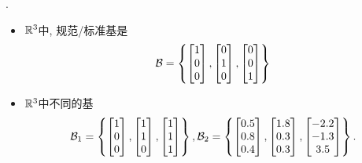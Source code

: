 \begin{example}
    .
    \begin{itemize}
        \item $\mathbb{R}^3$中, 规范/标准基是
        \begin{equation}
            \mathcal{B} = \left\{
                \begin{bmatrix} 1 \\ 0 \\ 0 \end{bmatrix},
                \begin{bmatrix} 0 \\ 1 \\ 0 \end{bmatrix},
                \begin{bmatrix} 0 \\ 0 \\ 1 \end{bmatrix}
            \right\}
        \end{equation}
        \item $\mathbb{R}^3$中不同的基
        \begin{equation}
           \mc{B}_1 = \left\{
                \begin{bmatrix} 1 \\ 0 \\ 0 \end{bmatrix},
                \begin{bmatrix} 1 \\ 1 \\ 0 \end{bmatrix},
                \begin{bmatrix} 1 \\ 1 \\ 1 \end{bmatrix}
            \right\},
            \mc{B}_2 = \left\{
                \begin{bmatrix} 0.5 \\ 0.8 \\ 0.4 \end{bmatrix},
                \begin{bmatrix} 1.8 \\ 0.3 \\ 0.3 \end{bmatrix},
                \begin{bmatrix} -2.2 \\ -1.3 \\ 3.5 \end{bmatrix}
            \right\}.

\end{equation}
\end{itemize}
\end{example}
